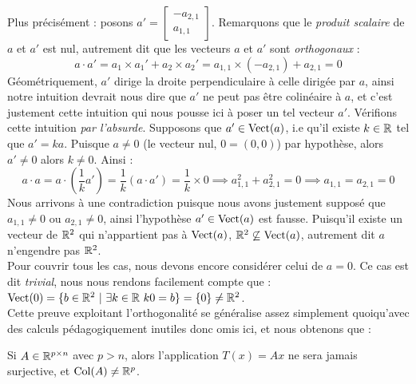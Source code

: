 Plus précisément : posons $a' = \begin{bmatrix}
-a_{2,1} \\
a_{1,1}
\end{bmatrix}$. Remarquons que le \textit{produit scalaire} de $a$ et $a'$ est nul, autrement dit que les vecteurs $a$ et $a'$ sont \textit{orthogonaux} : $$a \cdot a' = a_1 \times a_1' + a_2 \times a_2' = a_{1,1}\times (-a_{2,1}) + a_{2,1} = 0$$
Géométriquement, $a'$ dirige la droite perpendiculaire à celle dirigée par $a$, ainsi notre intuition devrait nous dire que $a'$ ne peut pas être colinéaire à $a$, et c'est justement cette intuition qui nous pousse ici à poser un tel vecteur $a'$. Vérifions cette intuition \textit{par l'absurde}. Supposons que $a' \in \operatorname{Vect}(a)$, i.e qu'il existe $k \in \mathbb{R}$ tel que $a' = ka$. Puisque $a \neq 0$ (le vecteur nul, $0 = (0,0)$) par hypothèse, alors $a' \neq 0$ alors $k \neq 0$. Ainsi : $$a \cdot a = a \cdot \left(\frac{1}{k}a'\right) = \frac{1}{k}(a \cdot a') = \frac{1}{k} \times 0 \implies a_{1,1}^2 + a_{2,1}^2 = 0 \implies a_{1,1} = a_{2,1} = 0$$
\noindent Nous arrivons à une contradiction puisque nous avons justement supposé que $a_{1,1} \neq 0$ ou $a_{2,1} \neq 0$, ainsi l'hypothèse $a' \in \operatorname{Vect}(a)$ est fausse. Puisqu'il existe un vecteur de $\mathbb{R}^2$ qui n'appartient pas à $\operatorname{Vect}(a)$, $\mathbb{R}^2 \not \subseteq \operatorname{Vect}(a)$, autrement dit $a$ n'engendre pas $\mathbb{R}^2$. \\

\noindent Pour couvrir tous les cas, nous devons encore considérer celui de $a = 0$. Ce cas est dit \textit{trivial}, nous nous rendons facilement compte que : $\operatorname{Vect}(0) = \{b \in \mathbb{R}^2 \ | \ \exists k \in \mathbb{R}\ k0 = b\} = \{0\} \neq  \mathbb{R}^2$.\\ 

\noindent Cette preuve exploitant l'orthogonalité se généralise assez simplement quoiqu'avec des calculs pédagogiquement inutiles donc omis ici, et nous obtenons que :
\begin{boxprop}
Si $A \in \mathbb{R}^{p \times n}$ avec $p > n$, alors l'application $T(x)=Ax$ ne sera jamais surjective, et $\text{Col}(A) \neq \mathbb{R}^p$.
\end{boxprop}

